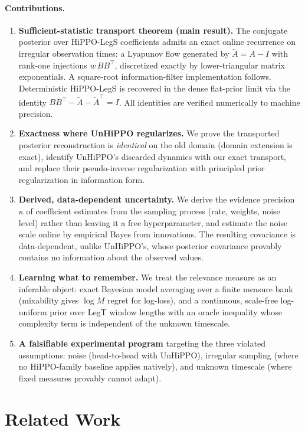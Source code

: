 \documentclass[11pt]{article}
\newcommand{\At}{\widetilde{A}}
\begin{document}
\paragraph{Contributions.}
\begin{enumerate}
    \item \textbf{Sufficient-statistic transport theorem (main result).} The conjugate posterior over HiPPO-LegS coefficients admits an exact online recurrence on irregular observation times: a Lyapunov flow generated by $\At=A-I$ with rank-one injections $w\,BB^\top$, discretized exactly by lower-triangular matrix exponentials. A square-root information-filter implementation follows. Deterministic HiPPO-LegS is recovered in the dense flat-prior limit via the identity $BB^\top-\At-\At^\top=I$. All identities are verified numerically to machine precision.
    \item \textbf{Exactness where UnHiPPO regularizes.} We prove the transported posterior reconstruction is \emph{identical} on the old domain (domain extension is exact), identify UnHiPPO's discarded dynamics with our exact transport, and replace their pseudo-inverse regularization with principled prior regularization in information form.
    \item \textbf{Derived, data-dependent uncertainty.} We derive the evidence precision $\kappa$ of coefficient estimates from the sampling process (rate, weights, noise level) rather than leaving it a free hyperparameter, and estimate the noise scale online by empirical Bayes from innovations. The resulting covariance is data-dependent, unlike UnHiPPO's, whose posterior covariance provably contains no information about the observed values.
    \item \textbf{Learning what to remember.} We treat the relevance measure as an inferable object: exact Bayesian model averaging over a finite measure bank (mixability gives $\log M$ regret for log-loss), and a continuous, scale-free log-uniform prior over LegT window lengths with an oracle inequality whose complexity term is independent of the unknown timescale.
    \item \textbf{A falsifiable experimental program} targeting the three violated assumptions: noise (head-to-head with UnHiPPO), irregular sampling (where no HiPPO-family baseline applies natively), and unknown timescale (where fixed measures provably cannot adapt).
\end{enumerate}

\section{Related Work}\label{sec:related}
\end{document}
